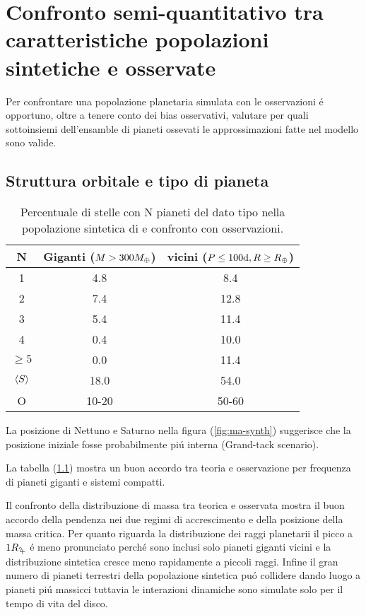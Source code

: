 {\let\clearpage\relax\let\cleardoublepage\relax
\chapter{Confronto semi-quantitativo tra caratteristiche popolazioni sintetiche e osservate}
}

Per confrontare una popolazione planetaria simulata con le osservazioni \'e opportuno, oltre a tenere conto dei bias osservativi, valutare per quali sottoinsiemi dell'ensamble di pianeti ossevati le approssimazioni fatte nel modello sono valide.

\section{Struttura orbitale e tipo di pianeta}

\begin{table}
\begin{tabular}{|ccc|}
\hline
N&Giganti ($M>300M_{\oplus}{}$)&vicini ($P\leq100\si{\day}, R\geq\rearth{}$)\\
\hline
1&4.8&8.4\\
2&7.4&12.8\\
3&5.4&11.4\\
4&0.4&10.0\\
$\geq5$&0.0&11.4\\
$\langle S \rangle$&18.0&54.0\\
O&10-20&50-60\\
\hline
\end{tabular}
\caption{Percentuale di stelle con N pianeti del dato tipo nella popolazione sintetica di \cite{mordasini2018planetary} e confronto con osservazioni.}\label{tab:planetfreq}
\end{table}

La posizione di Nettuno e Saturno nella figura (\ref{fig:ma-synth}) suggerisce che la posizione iniziale fosse probabilmente pi\'u interna (Grand-tack scenario).

La tabella (\ref{tab:planetfreq}) mostra un buon accordo tra teoria e osservazione per frequenza di pianeti giganti e sistemi compatti.

Il confronto della distribuzione di massa tra teorica e osservata mostra il buon accordo della pendenza nei due regimi di accrescimento e della posizione della massa critica. Per quanto riguarda la distribuzione dei raggi planetarii il picco a $1\rjupiter{}$ \'e meno pronunciato perch\'e sono inclusi solo pianeti giganti vicini e la distribuzione sintetica cresce meno rapidamente a piccoli raggi. Infine il gran numero di pianeti terrestri della popolazione sintetica pu\'o collidere dando luogo a pianeti pi\'u massicci tuttavia le interazioni dinamiche sono simulate solo per il tempo di vita del disco.

